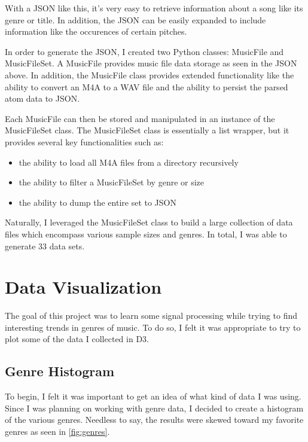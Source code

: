 \documentclass[journal]{vgtc}                %
\begin{document}
With a JSON like this, it's very easy to retrieve information about a song like
its genre or title. In addition, the JSON can be easily expanded to include
information like the occurences of certain pitches.

In order to generate the JSON, I created two Python classes: MusicFile and
MusicFileSet. A MusicFile provides music file data storage as seen in the JSON
above. In addition, the MusicFile class provides extended functionality like
the ability to convert an M4A to a WAV file and the ability to persist the
parsed atom data to JSON.

Each MusicFile can then be stored and manipulated in an instance of the
MusicFileSet class. The MusicFileSet class is essentially a list wrapper, but
it provides several key functionalities such as:

\begin{itemize}
  \item the ability to load all M4A files from a directory recursively
  \item the ability to filter a MusicFileSet by genre or size
  \item the ability to dump the entire set to JSON
\end{itemize}

Naturally, I leveraged the MusicFileSet class to build a large collection of
data files which encompass various sample sizes and genres. In total, I was
able to generate 33 data sets.

\section{Data Visualization}

The goal of this project was to learn some signal processing while trying to
find interesting trends in genres of music. To do so, I felt it was appropriate
to try to plot some of the data I collected in D3.

\subsection{Genre Histogram}

To begin, I felt it was important to get an idea of what kind of data I was
using. Since I was planning on working with genre data, I decided to create
a histogram of the various genres. Needless to say, the results were skewed
toward my favorite genres as seen in \autoref{fig:genres}.
\end{document}
